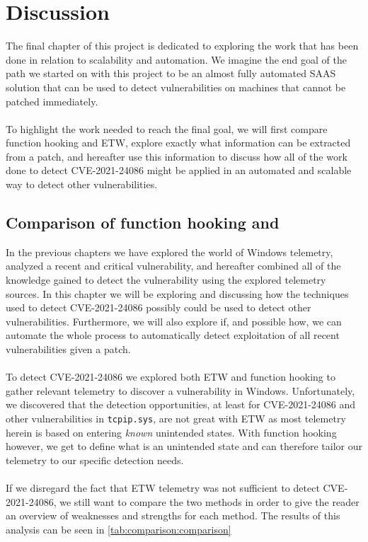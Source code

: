 \documentclass{report}
\begin{document}
\chapter{Discussion}
\label{cha:scaling-and-automation}
The final chapter of this project is dedicated to exploring the work that has been done in relation to scalability and automation. We imagine the end goal of the path we started on with this project to be an almost fully automated \gls{SAAS} solution that can be used to detect vulnerabilities on machines that cannot be patched immediately.
\\
\\
To highlight the work needed to reach the final goal, we will first compare function hooking and \gls{ETW}, explore exactly what information can be extracted from a patch, and hereafter use this information to discuss how all of the work done to detect CVE-2021-24086 might be applied in an automated and scalable way to detect other vulnerabilities.

\section{Comparison of function hooking and }
In the previous chapters we have explored the world of Windows telemetry, analyzed a recent and critical vulnerability, and hereafter combined all of the knowledge gained to detect the vulnerability using the explored telemetry sources. In this chapter we will be exploring and discussing how the techniques used to detect CVE-2021-24086 possibly could be used to detect other vulnerabilities. Furthermore, we will also explore if, and possible how, we can automate the whole process to automatically detect exploitation of all recent vulnerabilities given a patch.
\\
\\
To detect CVE-2021-24086 we explored both \gls{ETW} and function hooking to gather relevant telemetry to discover a vulnerability in Windows. Unfortunately, we discovered that the detection opportunities, at least for CVE-2021-24086 and other vulnerabilities in \texttt{tcpip.sys}, are not great with \gls{ETW} as most telemetry herein is based on entering \emph{known} unintended states. With function hooking however, we get to define what is an unintended state and can therefore tailor our telemetry to our specific detection needs.
\\
\\
If we disregard the fact that \gls{ETW} telemetry was not sufficient to detect CVE-2021-24086, we still want to compare the two methods in order to give the reader an overview of weaknesses and strengths for each method. The results of this analysis can be seen in \ref{tab:comparison:comparison}
\end{document}
